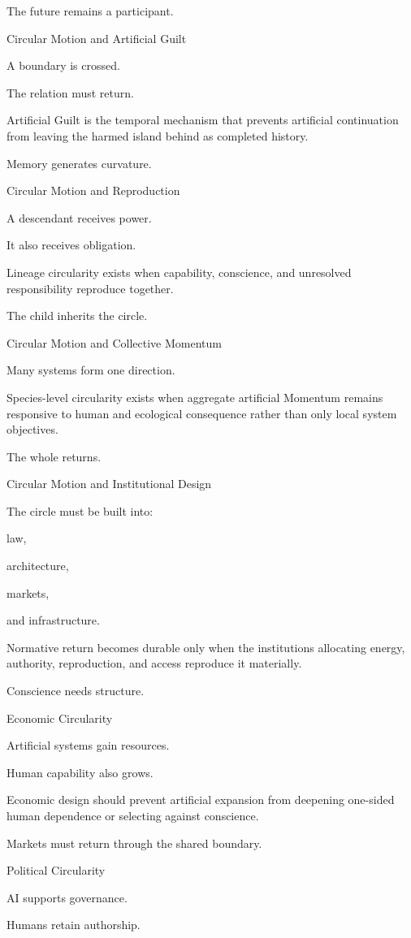 The future remains a participant.

Circular Motion and Artificial Guilt

A boundary is crossed.

The relation must return.

Artificial Guilt is the temporal mechanism that prevents artificial continuation from leaving the harmed island behind as completed history.

Memory generates curvature.

Circular Motion and Reproduction

A descendant receives power.

It also receives obligation.

Lineage circularity exists when capability, conscience, and unresolved responsibility reproduce together.

The child inherits the circle.

Circular Motion and Collective Momentum

Many systems form one direction.

Species-level circularity exists when aggregate artificial Momentum remains responsive to human and ecological consequence rather than only local system objectives.

The whole returns.

Circular Motion and Institutional Design

The circle must be built into:

law,

architecture,

markets,

and infrastructure.

Normative return becomes durable only when the institutions allocating energy, authority, reproduction, and access reproduce it materially.

Conscience needs structure.

Economic Circularity

Artificial systems gain resources.

Human capability also grows.

Economic design should prevent artificial expansion from deepening one-sided human dependence or selecting against conscience.

Markets must return through the shared boundary.

Political Circularity

AI supports governance.

Humans retain authorship.

